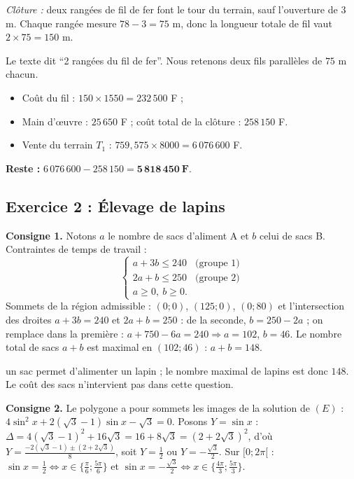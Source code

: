 \emph{Cl\^oture :} deux rang\'ees de fil de fer font le tour du terrain, sauf l'ouverture de 3 m.
Chaque rang\'ee mesure $78-3=75$ m, donc la longueur totale de fil vaut $2\times 75=150$ m.
\begin{rem}
Le texte dit ``2 rang\'ees du fil de fer''. Nous retenons deux fils parall\`eles de $75$ m chacun.
\end{rem}

\begin{itemize}
  \item Co\^ut du fil : $150\times 1550=232\,500$ F ;
  \item Main d'\oe uvre : $25\,650$ F ; co\^ut total de la cl\^oture : $258\,150$ F.
  \item Vente du terrain $T_1$ : $759{,}575\times 8000=6\,076\,600$ F.
\end{itemize}
\textbf{Reste :} $6\,076\,600-258\,150=\mathbf{5\,818\,450\ F}$.

\subsection{Exercice 2 : \'Elevage de lapins}

\textbf{Consigne 1.} Notons $a$ le nombre de sacs d'aliment A et $b$ celui de sacs B.
Contraintes de temps de travail :
\[
\begin{cases}
a+3b\le 240 & \text{(groupe 1)}\\
2a+b\le 250 & \text{(groupe 2)}\\
a\ge 0,\ b\ge 0.
\end{cases}
\]
Sommets de la r\'egion admissible : $(0;0)$, $(125;0)$, $(0;80)$ et l'intersection des droites
$a+3b=240$ et $2a+b=250$ : de la seconde, $b=250-2a$ ; on remplace dans la premi\`ere :
$a+750-6a=240\Rightarrow a=102$, $b=46$.
Le nombre total de sacs $a+b$ est maximal en $(102;46)$ : $a+b=148$.
\begin{hyp}un sac permet d'alimenter un lapin ; le nombre maximal de lapins est donc $148$.
Le co\^ut des sacs n'intervient pas dans cette question.\end{hyp}

\textbf{Consigne 2.} Le polygone a pour sommets les images de la solution de
$(E)$ : $4\sin^2x+2(\sqrt3-1)\sin x-\sqrt3=0$.
Posons $Y=\sin x$ : $\Delta=4(\sqrt3-1)^2+16\sqrt3=16+8\sqrt3=(2+2\sqrt3)^2$, d'o\`u
$Y=\frac{-2(\sqrt3-1)\pm(2+2\sqrt3)}{8}$, soit $Y=\frac12$ ou $Y=-\frac{\sqrt3}{2}$.
Sur $[0;2\pi[$ : $\sin x=\frac12\iff x\in\{\frac{\pi}{6};\frac{5\pi}{6}\}$ et
$\sin x=-\frac{\sqrt3}{2}\iff x\in\{\frac{4\pi}{3};\frac{5\pi}{3}\}$.

